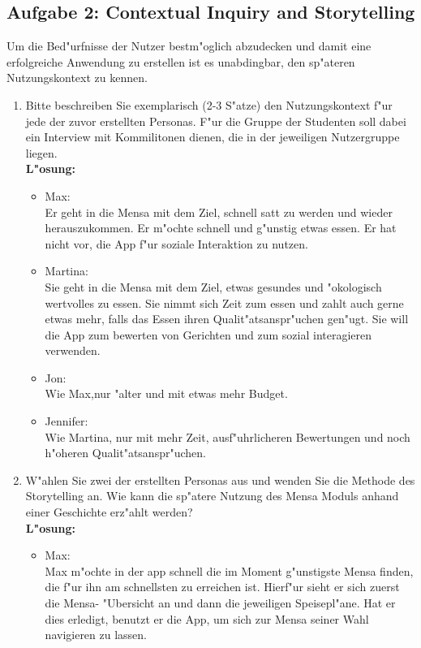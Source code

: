 \subsection{Aufgabe 2:  Contextual Inquiry and Storytelling }
Um  die  Bed"urfnisse  der  Nutzer  bestm"oglich  abzudecken  und  damit  eine  erfolgreiche Anwendung zu erstellen ist es unabdingbar, den sp"ateren Nutzungskontext zu kennen.\\
\begin {enumerate}
    \item Bitte beschreiben Sie exemplarisch (2-3 S"atze) den Nutzungskontext f"ur jede der zuvor erstellten  Personas.  
        F"ur  die  Gruppe  der  Studenten  soll  dabei  ein  Interview  mit Kommilitonen dienen, die in der jeweiligen Nutzergruppe liegen.  \\
    \textbf{L"osung:}
    \begin{itemize}
        \item Max: \\
            Er geht in die Mensa mit dem Ziel, schnell satt zu werden und wieder herauszukommen.
            Er m"ochte schnell und g"unstig etwas essen.
            Er hat nicht vor, die App f"ur soziale Interaktion zu nutzen.
        \item Martina: \\
            Sie geht in die Mensa mit dem Ziel, etwas gesundes und "okologisch wertvolles zu essen.
            Sie nimmt sich Zeit zum essen und zahlt auch gerne etwas mehr, falls das Essen ihren Qualit"atsanspr"uchen gen"ugt.
            Sie will die App zum bewerten von Gerichten und zum sozial interagieren verwenden.
        \item Jon: \\
            Wie Max,nur "alter und mit etwas mehr Budget.
        \item Jennifer: \\
            Wie Martina, nur mit mehr Zeit, ausf"uhrlicheren Bewertungen und noch h"oheren Qualit"atsanspr"uchen.
    \end{itemize}
    \item W"ahlen  Sie  zwei  der  erstellten  Personas  aus  und  wenden  Sie  die  Methode  des Storytelling  an.  
        Wie  kann  die  sp"atere  Nutzung  des  Mensa  Moduls  anhand  einer Geschichte erz"ahlt werden? \\
    \textbf{L"osung:}        
    \begin{itemize}
        \item Max: \\
            Max m"ochte in der app schnell die im Moment g"unstigste Mensa finden, die f"ur ihn am schnellsten zu erreichen ist. 
            Hierf"ur sieht er sich zuerst die Mensa- "Ubersicht an und dann die jeweiligen Speisepl"ane. 
            Hat er dies erledigt, benutzt er die App, um sich zur Mensa seiner Wahl navigieren zu lassen. 


\end{itemize}
\end{enumerate}
